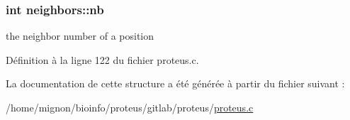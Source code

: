 \hypertarget{structneighbors_a0632cb660bbcd34eb0c1f15b4f2265f8}{
\subsubsection[{nb}]{\setlength{\rightskip}{0pt plus 5cm}int neighbors\+::nb}}\label{structneighbors_a0632cb660bbcd34eb0c1f15b4f2265f8}


the neighbor number of a position 



Définition à la ligne 122 du fichier proteus.\+c.



La documentation de cette structure a été générée à partir du fichier suivant \+:\begin{DoxyCompactItemize}
\item 
/home/mignon/bioinfo/proteus/gitlab/proteus/\hyperlink{proteus_8c}{proteus.\+c}\end{DoxyCompactItemize}
